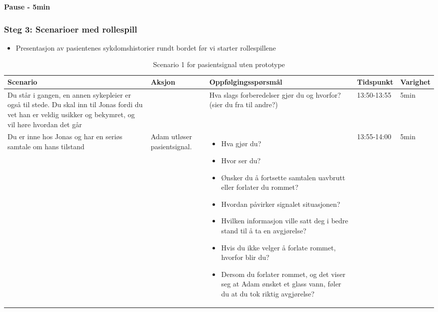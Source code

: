 \textbf{Pause - 5min}
\pagebreak
\subsubsection{Steg 3: Scenarioer med rollespill}



\begin{itemize}
\item Presentasjon av pasientenes sykdomshistorier rundt bordet før vi starter rollespillene
\end{itemize}

\begin{table}[H]
\small
\begin{tabular}{p{3cm}|p{2cm}|p{4cm}|l|l}
\hline
\textbf{Scenario} & \textbf{Aksjon} & \textbf{Oppfølgingsspørsmål} & \textbf{Tidspunkt} & \textbf{Varighet}\\
\hline
Du står i gangen, en annen sykepleier er også til stede. Du skal inn til Jonas fordi du vet han er veldig usikker og bekymret, og vil høre hvordan det går & & Hva slags forberedelser gjør du og hvorfor? (sier du fra til andre?)
& 13:50-13:55 & 5min\\
\hline
Du er inne hos Jonas og har en seriøs samtale om hans tilstand & Adam utløser pasientsignal. & 
\begin{itemize}
\item Hva gjør du?
\item Hvor ser du?
\item Ønsker du å fortsette samtalen uavbrutt eller forlater du rommet?
\item Hvordan påvirker signalet situasjonen?
\item Hvilken informasjon ville satt deg i bedre stand til å ta en avgjørelse?
\item Hvis du ikke velger å forlate rommet, hvorfor blir du?
\item Dersom du forlater rommet, og det viser seg at Adam ønsket et glass vann, føler du at du tok riktig avgjørelse?
\end{itemize}
 & 13:55-14:00 & 5min\\
\end{tabular}
\caption{Scenario 1 for pasientsignal uten prototype}
\label{Steg3.1}
\end{table}


